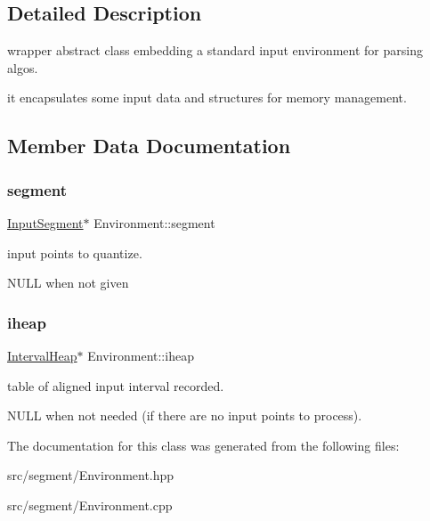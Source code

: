 \subsection{Detailed Description}
wrapper abstract class embedding a standard input environment for parsing algos. 

it encapsulates some input data and structures for memory management. 

\subsection{Member Data Documentation}
\mbox{\label{classEnvironment_a740b0264644db40cb5a657f7ed52bb23}} 
\subsubsection{\texorpdfstring{segment}{segment}}
{\footnotesize\ttfamily \mbox{\hyperlink{classInputSegment}{Input\+Segment}}$\ast$ Environment\+::segment}



input points to quantize. 

N\+U\+LL when not given \mbox{\label{classEnvironment_a810e4b1bd5bd6428c78c18fbeba127f6}} 
\subsubsection{\texorpdfstring{iheap}{iheap}}
{\footnotesize\ttfamily \mbox{\hyperlink{classIntervalHeap}{Interval\+Heap}}$\ast$ Environment\+::iheap}



table of aligned input interval recorded. 

N\+U\+LL when not needed (if there are no input points to process). 

The documentation for this class was generated from the following files\+:\begin{DoxyCompactItemize}
\item 
src/segment/Environment.\+hpp\item 
src/segment/Environment.\+cpp\end{DoxyCompactItemize}
